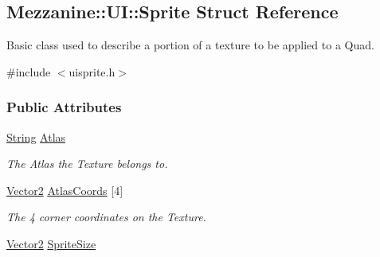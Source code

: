\hypertarget{structMezzanine_1_1UI_1_1Sprite}{
\subsection{Mezzanine::UI::Sprite Struct Reference}
\label{structMezzanine_1_1UI_1_1Sprite}
}


Basic class used to describe a portion of a texture to be applied to a Quad.  




{\ttfamily \#include $<$uisprite.h$>$}

\subsubsection*{Public Attributes}
\begin{DoxyCompactItemize}
\item 
\hypertarget{structMezzanine_1_1UI_1_1Sprite_a1c4c6485f61a7bb71c696d1c7426a2fb}{
\hyperlink{namespaceMezzanine_acf9fcc130e6ebf08e3d8491aebcf1c86}{String} \hyperlink{structMezzanine_1_1UI_1_1Sprite_a1c4c6485f61a7bb71c696d1c7426a2fb}{Atlas}}
\label{structMezzanine_1_1UI_1_1Sprite_a1c4c6485f61a7bb71c696d1c7426a2fb}

\begin{DoxyCompactList}\small\item\em The Atlas the Texture belongs to. \item\end{DoxyCompactList}\item 
\hypertarget{structMezzanine_1_1UI_1_1Sprite_af76e130e528fc4d6a498bd5c2182f0f7}{
\hyperlink{classMezzanine_1_1Vector2}{Vector2} \hyperlink{structMezzanine_1_1UI_1_1Sprite_af76e130e528fc4d6a498bd5c2182f0f7}{AtlasCoords} \mbox{[}4\mbox{]}}
\label{structMezzanine_1_1UI_1_1Sprite_af76e130e528fc4d6a498bd5c2182f0f7}

\begin{DoxyCompactList}\small\item\em The 4 corner coordinates on the Texture. \item\end{DoxyCompactList}\item 
\hypertarget{structMezzanine_1_1UI_1_1Sprite_a718957329eba0f09dd708f2bd35e194b}{
\hyperlink{classMezzanine_1_1Vector2}{Vector2} \hyperlink{structMezzanine_1_1UI_1_1Sprite_a718957329eba0f09dd708f2bd35e194b}{SpriteSize}}
\label{structMezzanine_1_1UI_1_1Sprite_a718957329eba0f09dd708f2bd35e194b}


\end{DoxyCompactItemize}
